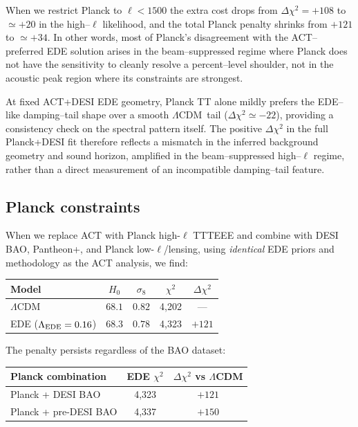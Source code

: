 \documentclass[onecolumn,showpacs,preprintnumbers,amsmath,amssymb,prd]{revtex4-2}
\newcommand{\lcdm}{$\Lambda$CDM}
\begin{document}
When we restrict Planck to $\ell < 1500$ the extra cost drops from
$\Delta\chi^2 = +108$ to $\simeq +20$ in the high--$\ell$ likelihood, and the
total Planck penalty shrinks from $+121$ to $\simeq +34$. In other words, most
of Planck's disagreement with the ACT--preferred EDE solution arises in the
beam--suppressed regime where Planck does not have the sensitivity to cleanly
resolve a percent--level shoulder, not in the acoustic peak region where its
constraints are strongest.

At fixed ACT+DESI EDE geometry, Planck TT alone mildly prefers the EDE--like
damping--tail shape over a smooth \lcdm\ tail ($\Delta\chi^2 \simeq -22$),
providing a consistency check on the spectral pattern itself. The positive
$\Delta\chi^2$ in the full Planck+DESI fit therefore reflects a mismatch in
the inferred background geometry and sound horizon, amplified in the
beam--suppressed high--$\ell$ regime, rather than a direct measurement of an
incompatible damping--tail feature.

\subsection{Planck constraints}

When we replace ACT with Planck high-$\ell$ TTTEEE and combine with DESI BAO, 
Pantheon+, and Planck low-$\ell$/lensing, using \emph{identical} EDE priors 
and methodology as the ACT analysis, we find:
\begin{center}
\begin{tabular}{lcccc}
\toprule
Model & $H_0$ & $\sigma_8$ & $\chi^2$ & $\Delta\chi^2$ \\
\midrule
\lcdm & $68.1$ & $0.82$ & 4,202 & --- \\
EDE ($\Lambda_{\rm EDE} = 0.16$) & $68.3$ & $0.78$ & 4,323 & $+121$ \\
\bottomrule
\end{tabular}
\end{center}

The penalty persists regardless of the BAO dataset:
\begin{center}
\begin{tabular}{lcc}
\toprule
Planck combination & EDE $\chi^2$ & $\Delta\chi^2$ vs \lcdm \\
\midrule
Planck + DESI BAO & 4,323 & $+121$ \\
Planck + pre-DESI BAO & 4,337 & $+150$ \\
\bottomrule
\end{tabular}
\end{center}
\end{document}
